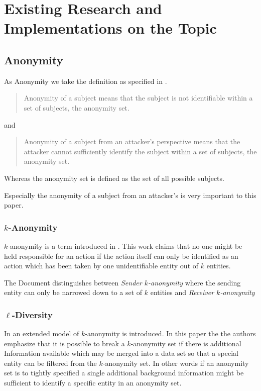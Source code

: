 

\chapter{Existing Research and Implementations on the Topic}
\section{Anonymity}
As Anonymity we take the definition as specified in \cite{anon_terminology}.
\begin{quote}
	Anonymity of a subject means that the subject is not identifiable within a set of subjects, the anonymity set.\omitted
\end{quote}
and
\begin{quote}
	Anonymity of a subject from an attacker's perspective means that the attacker cannot sufficiently identify the subject within a set of subjects, the anonymity set.\omitted
\end{quote}

Whereas the anonymity set is defined as the set of all possible subjects.

Especially the anonymity of a subject from an attacker's is very important to this paper. 

\subsection{$k$-Anonymity}
$k$-anonymity is a term introduced in \cite{k-anonymous:ccs2003}. This work claims that no one might be held responsible for an action if the action itself can only be identified as an action which has been taken by one unidentifiable entity out of $k$ entities.

The Document distinguishes between \textit{Sender $k$-anonymity} where the sending entity can only be narrowed down to a set of $k$ entities and \textit{Receiver $k$-anonymity} 


\subsection{$\ell$-Diversity}
In \cite{machanavajjhala2007diversity} an extended model of $k$-anonymity is introduced. In this paper the the authors emphasize that it is possible to break a $k$-anonymity set if there is additional Information available which may be merged into a data set so that a special entity can be filtered from the $k$-anonymity set. In other words if an anonymity set is to tightly specified a single additional background information might be sufficient to identify a specific entity in an anonymity set.

